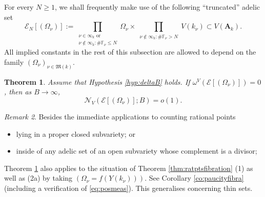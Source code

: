 \documentclass[11pt,letterpaper]{amsart}
\newcommand{\BF}{{\mathbb {F}}}
\newcommand{\CE}{{\mathcal {E}}}
\newcommand{\CN}{{\mathcal {N}}}
\newcommand{\RA}{{\mathbf {A}}}
\theoremstyle{plain}
\numberwithin{equation}{section}
\newtheorem{theorem}{Theorem}[section]
\theoremstyle{definition}
\theoremstyle{remark}
\newtheorem{remark}[theorem]{Remark}
\begin{document}
For every $N\geqslant 1$, we shall frequently make use of the following ``truncated'' adelic set \begin{equation}\label{eq:truncate}
	\CE_{N}[(\Omega_{\nu})]:= \prod_{\substack{\nu\in\infty_k\text{ or}\\\nu\not\in\infty_k: \#\BF_\nu\leqslant N}}\Omega_\nu\times \prod_{\substack{\nu\notin\infty_k: \#\BF_\nu>N}} V(k_\nu) \subset V(\RA_k).
\end{equation}
All implied constants in the rest of this subsection are allowed to depend on the family $(\Omega_\nu)_{\nu\in\mathfrak{M}(k)}$.
\begin{theorem}\label{thm:Tamagawazero}
	Assume that Hypothesis \ref{hyp:deltaB} holds. If $\omega^V\left(\CE[(\Omega_{\nu})]\right)=0$, then as $B\to \infty$,
	$$\CN_V\left(\CE[(\Omega_{\nu})];B\right)=o(1).$$
\end{theorem}
\begin{remark}
	Besides the immediate applications to counting rational points
	\begin{itemize}
		\item  lying in a proper closed subvariety; or
		\item inside of any adelic set of an open subvariety whose complement is a divisor;
	\end{itemize} Theorem \ref{thm:Tamagawazero} also applies to the situation of Theorem  \ref{thm:ratptsfibration} (1) as well as (2a) by taking $(\Omega_\nu=f(Y(k_\nu)))$. See Corollary \ref{co:paucityfibra} (including a verification of \eqref{eq:posmeas}). This generalises \cite[Theorems 1.2 \& 1.4]{Browning-Loughran} concerning thin sets.
\end{remark}
\end{document}
